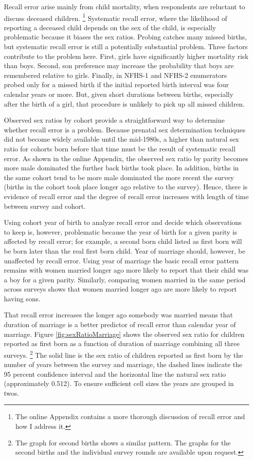 \documentclass[12pt,letterpaper]{article}
\begin{document}
Recall error arise mainly from child mortality, when respondents are reluctant to
discuss deceased children.%
\footnote{
The online Appendix contains a more thorough discussion of recall error and how I address it.
} 
Systematic recall error, where the likelihood of reporting a deceased child depends on
the sex of the child, is especially problematic because it biases the sex ratios.
Probing catches many missed births, but systematic recall error is still a potentially 
substantial problem.
Three factors contribute to the problem here.
First, girls have significantly higher mortality risk than boys.
Second, son preference may increase the probability that boys are remembered relative to girls.
Finally, in NFHS-1 and NFHS-2 enumerators probed only for a missed birth if the
initial reported birth interval was four calendar years or more.
But, given short durations between births, especially after the birth of a girl,
that procedure is unlikely to pick up all missed children.

Observed sex ratios by cohort provide a straightforward way to determine 
whether recall error is a problem.
Because prenatal sex determination techniques did not become widely available until the 
mid-1980s, a higher than natural sex ratio for cohorts born before that time must be 
the result of systematic recall error.
As shown in the online Appendix, the observed sex ratio by parity becomes more male dominated the 
further back births took place.
In addition, births in the same cohort tend to be more male dominated the more recent the 
survey (births in the cohort took place longer ago relative to the survey).
Hence, there is evidence of recall error and the degree of recall error increases
with length of time between survey and cohort.

Using cohort year of birth to analyze recall error and decide which observations
to keep is, however, problematic because the year of birth for a given parity is affected 
by recall error; for example, a second born child listed as first born will be 
born later than the real first born child.
Year of marriage should, however, be unaffected by recall error.
Using year of marriage the basic recall error pattern remains with women married longer 
ago more likely to report that their child was a boy for a given parity.
Similarly, comparing women married in the same period across surveys shows
that women married longer ago are more likely to report having sons.

That recall error increases the longer ago somebody was married means
that duration of marriage is a better predictor of recall error than calendar year of 
marriage.
Figure \ref{fig:sexRatioMarriage} shows the observed sex ratio for children 
reported as first born as a function of duration of marriage combining all three surveys.%
\footnote{
The graph for second births shows a similar pattern.
The graphs for the second births and the individual survey rounds are available upon request.
}
The solid line is the sex ratio of children reported 
as first born by the number of years between the survey and marriage, 
the dashed lines indicate the 95 percent confidence interval 
and the horizontal line the natural sex ratio (approximately 0.512).
To ensure sufficient cell sizes the years are grouped in twos.
\end{document}
